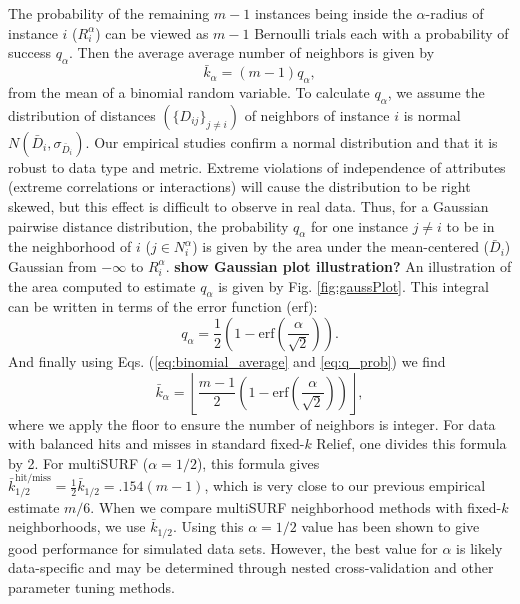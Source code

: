 \documentclass[10pt,letterpaper]{article}\usepackage[]{graphicx}\usepackage[]{color}
\begin{document}
The probability of the remaining $m-1$ instances being inside the $\alpha$-radius of instance $i$ ($R_i^{\alpha}$) can be viewed as $m-1$ Bernoulli trials each with a probability of success $q_{\alpha}$. Then the average average number of neighbors is given by
\begin{equation}
\label{eq:binomial_average}
  {\bar{k}}_{\alpha} = (m-1)q_{\alpha},
\end{equation}
from the mean of a binomial random variable. To calculate $q_{\alpha}$, we assume the distribution of distances $(\{D_{ij} \}_{j \ne i})$ of neighbors of instance $i$ is normal $N(\bar{D}_i,\sigma_{\bar{D}_i})$. Our empirical studies confirm a normal distribution and that it is robust to data type and metric. Extreme violations of independence of attributes (extreme correlations or interactions) will cause the distribution to be right skewed, but this effect is difficult to observe in real data. Thus, for a Gaussian pairwise distance distribution, the probability $q_{\alpha}$ for one instance $j \ne i$ to be in the neighborhood of $i$ ($j \in N^{\alpha}_{i}$) is given by the area under the mean-centered ($\bar{D}_i$) Gaussian from $-\infty$ to $R_i^{\alpha}$. {\bf show Gaussian plot illustration?} An illustration of the area computed to estimate $q_{\alpha}$ is given by Fig. \ref{fig:gaussPlot}. This integral can be written in terms of the error function (erf):
\begin{equation}
\label{eq:q_prob}
q_{\alpha} = \frac{1}{2} \left( 1 - \mathrm{erf}\left( \frac{\alpha}{\sqrt{2}} \right) \right).
\end{equation}
And finally using Eqs. (\ref{eq:binomial_average} and \ref{eq:q_prob}) we find
\begin{equation}\label{eq:kbar}
{\bar{k}}_{\alpha} = \left \lfloor \frac{m-1}{2}  \left( 1 - \mathrm{erf}\left( \frac{\alpha}{\sqrt{2}} \right) \right) \right \rfloor,
\end{equation}
where we apply the floor to ensure the number of neighbors is integer. For data with balanced hits and misses in standard fixed-$k$ Relief, one divides this formula by 2. For multiSURF ($\alpha=1/2$), this formula gives $\bar{k}_{1/2}^{\text{hit/miss}} = \frac{1}{2}\bar{k}_{1/2} = .154 (m-1)$, which is very close to our previous empirical estimate $m/6$. When we compare multiSURF neighborhood methods with fixed-$k$ neighborhoods, we use $\bar{k}_{1/2}$. Using this $\alpha=1/2$ value has been shown to give good performance for simulated data sets. However, the best value for $\alpha$ is likely data-specific and may be determined through nested cross-validation and other parameter tuning methods.
\end{document}
